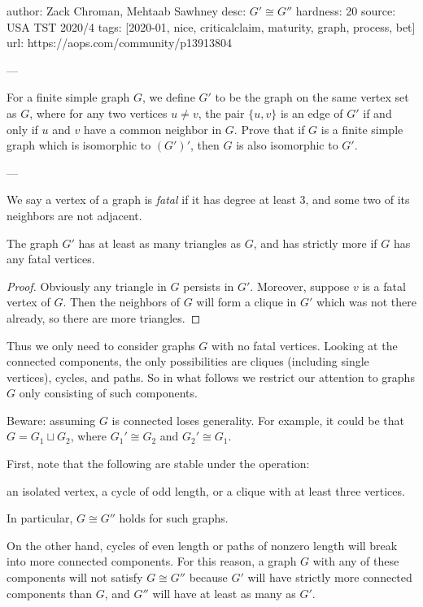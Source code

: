 author: Zack Chroman, Mehtaab Sawhney
desc: $G' \cong G''$
hardness: 20
source: USA TST 2020/4
tags: [2020-01, nice, criticalclaim, maturity, graph, process, bet]
url: https://aops.com/community/p13913804

---

For a finite simple graph $G$, we define $G'$ to be the graph
on the same vertex set as $G$, where for any two vertices $u \neq v$,
the pair $\{u,v\}$ is an edge of $G'$ if and only if
$u$ and $v$ have a common neighbor in $G$.
Prove that if $G$ is a finite simple graph which is isomorphic to $(G')'$,
then $G$ is also isomorphic to $G'$.

---

We say a vertex of a graph is \emph{fatal} if it has degree at least $3$,
and some two of its neighbors are not adjacent.

\begin{claim*}
  The graph $G'$ has at least as many triangles as $G$,
  and has strictly more if $G$ has any fatal vertices.
\end{claim*}
\begin{proof}
  Obviously any triangle in $G$ persists in $G'$.
  Moreover, suppose $v$ is a fatal vertex of $G$.
  Then the neighbors of $G$ will form a clique in $G'$
  which was not there already, so there are more triangles.
\end{proof}

Thus we only need to consider graphs $G$ with no fatal vertices.
Looking at the connected components, the only possibilities are cliques
(including single vertices), cycles, and paths.
So in what follows we restrict our attention to graphs $G$
only consisting of such components.

\begin{remark*}
  [Warning]
  Beware: assuming $G$ is connected loses generality.
  For example, it could be that $G = G_1 \sqcup G_2$,
  where $G_1' \cong G_2$ and $G_2' \cong G_1$.
\end{remark*}

First, note that the following are stable under the operation:
\begin{itemize}
  \ii an isolated vertex,
  \ii a cycle of odd length, or
  \ii a clique with at least three vertices.
\end{itemize}
In particular, $G \cong G''$ holds for such graphs.

On the other hand, cycles of even length or paths of nonzero
length will break into more connected components.
For this reason, a graph $G$ with any of these components will not satisfy $G \cong G''$
because $G'$ will have strictly more connected components than $G$,
and $G''$ will have at least as many as $G'$.

